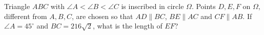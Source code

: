Triangle $ABC$ with $\angle A<\angle B<\angle C$ is inscribed in circle $\Omega$. Points $D,E,F$ on $\Omega$, different from $A,B,C$, are chosen so that $AD\parallel BC$, $BE\parallel AC$ and $CF\parallel AB$. If $\angle A=45^\circ$ and $BC=216\sqrt2$, what is the length of $EF$?
